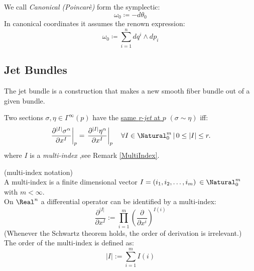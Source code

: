 \documentclass[a4paper,10pt,smallheadings]{scrartcl}
\begin{document}
					\begin{definition}\label{Def:NatSymForm}
						We call \emph{Canonical (Poincarè)} form the symplectic:
						\begin{displaymath}
							\omega_0 \coloneqq -d \theta_0
						\end{displaymath}
						In canonical coordinates it assumes the renown expression:
						\begin{displaymath}
							\omega_0 \coloneqq \sum_{i=1}^n  d q^i \wedge d p_i
						\end{displaymath}
					\end{definition}
					
					
		\subsection{Jet Bundles}\label{Sect:JetBundles}
			The jet bundle is a %
			construction that makes a new smooth fiber bundle out of a given bundle. 
			
			\begin{definition}
				Two sections $\sigma, \eta \in \Gamma^\infty(p)$ have the \underline{same \emph{r-jet} at $p$} $(\sigma \sim \eta)$ iff:
				\begin{displaymath}
					\left.\frac{\partial^{|I|} \sigma^{\alpha}}{\partial x^{I}}\right|_{p} = \left.\frac{\partial^{|I|} \eta^{\alpha}}{\partial x^{I}}\right|_{p} \quad \forall I\in \Natural^m_0 \, \vert \, 0 \leq |I| \leq r.
				\end{displaymath}
				where $I$ is a \emph{multi-index} ,see Remark \ref{MultiIndex}.
		\end{definition}
		\begin{remark}\label{MultiIndex}
			(multi-index notation)
			\\
			A multi-index is a %
			finite dimensional vector  $I=(i_1, i_2, \ldots, i_m)\: \in \Natural^m_0$ with $m<\infty$.
			\\
			On $\Real^n$ a differential operator can be identified by a multi-index:
			\begin{displaymath}
				\frac{\partial^{|I|}}{\partial x^{I}} := \prod_{i=1}^{m} \left( \frac{\partial}{\partial x^{i}} \right)^{I(i)}
			\end{displaymath}
			(Whenever the Schwartz theorem holds, the order of derivation is irrelevant.)
			\\
			The order of the multi-index is defined as:
			\begin{displaymath}
				|I| := \sum_{i=1}^{m} I(i)
			\end{displaymath}
		\end{remark}
\end{document}
